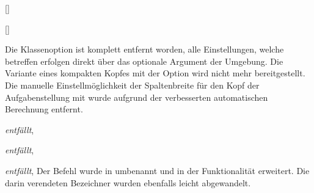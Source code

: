 \begin{Declaration}[v2.00]{[\PSet]}
\begin{Declaration}[v2.00]{[\PBoolean]}
\begin{Declaration}[v2.00]{}
%
Die Klassenoption  ist komplett entfernt worden, alle 
Einstellungen, welche  betreffen erfolgen direkt über das 
optionale Argument der Umgebung. Die Variante eines kompakten Kopfes mit der 
Option  wird nicht mehr bereitgestellt. Die manuelle 
Einstellmöglichkeit der Spaltenbreite für den Kopf der Aufgabenstellung mit 
 wurde aufgrund der verbesserten automatischen Berechnung 
entfernt.
\end{Declaration}
\end{Declaration}
\end{Declaration}

\begin{Declaration}[v2.00]{%
}{\emph{entfällt}, }
\begin{Declaration}[v2.00]{}{%
  \emph{entfällt}, %
}
\begin{Declaration}[v2.00]{}{%
  \emph{entfällt}, %
}
\printdeclarationlist*%
%
Der Befehl  wurde in  umbenannt und in der 
Funktionalität erweitert. Die darin verendeten Bezeichner wurden ebenfalls 
leicht abgewandelt.
\end{Declaration}
\end{Declaration}
\end{Declaration}

